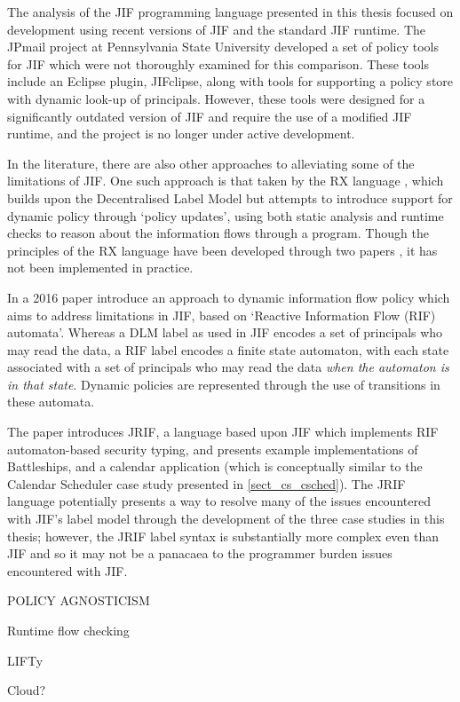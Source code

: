 The analysis of the JIF programming language presented in this thesis focused on development using recent versions of JIF and the standard JIF runtime. The JPmail project \cite{jpmailpage} at Pennsylvania State University developed a set of policy tools for JIF which were not thoroughly examined for this comparison. These tools include an Eclipse plugin, JIFclipse, along with tools for supporting a policy store with dynamic look-up of principals. However, these tools were designed for a significantly outdated version of JIF and require the use of a modified JIF runtime, and the project is no longer under active development.

In the literature, there are also other approaches to alleviating some of the limitations of JIF. One such approach is that taken by the RX language \cite{swamy06rx}, which builds upon the Decentralised Label Model but attempts to introduce support for dynamic policy through `policy updates', using both static analysis and runtime checks to reason about the information flows through a program. Though the principles of the RX language have been developed through two papers \cite{hicks05rx} \cite{swamy06rx}, it has not been implemented in practice.

In a 2016 paper \citeauthor{kozyri2016jrif} \cite{kozyri2016jrif} introduce an approach to dynamic information flow policy which aims to address limitations in JIF, based on `Reactive Information Flow (RIF) automata'. Whereas a DLM label as used in JIF encodes a set of principals who may read the data, a RIF label encodes a finite state automaton, with each state associated with a set of principals who may read the data \textit{when the automaton is in that state}. Dynamic policies are represented through the use of transitions in these automata.

The paper \cite{kozyri2016jrif} introduces JRIF, a language based upon JIF which implements RIF automaton-based security typing, and presents example implementations of Battleships, and a calendar application (which is conceptually similar to the Calendar Scheduler case study presented in \ref{sect_cs_csched}). The JRIF language potentially presents a way to resolve many of the issues encountered with JIF's label model through the development of the three case studies in this thesis; however, the JRIF label syntax is substantially more complex even than JIF and so it may not be a panacaea to the programmer burden issues encountered with JIF.


POLICY AGNOSTICISM

Runtime flow checking

LIFTy \cite{polikarpova2016lifty}

Cloud?